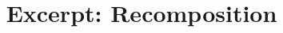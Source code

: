 \documentclass[acmsmall,10pt,review,anonymous]{acmart}\settopmatter{printfolios=true,printccs=false,printacmref=false}
\begin{document}
\title[Grove]{Excerpt: Recomposition}

\maketitle


\end{document}
